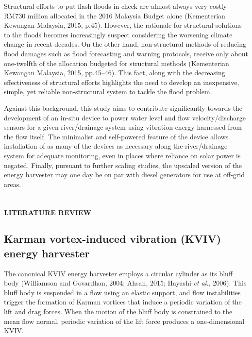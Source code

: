 \documentclass[]{article}
\begin{document}
Structural efforts to put flash floods in check are almost always very
costly - RM730 million allocated in the 2016 Malaysia Budget alone
(Kementerian Kewangan Malaysia, 2015, p.45). However, the rationale for
structural solutions to the floods becomes increasingly suspect
considering the worsening climate change in recent decades. On the other
hand, non-structural methods of reducing flood damages such as flood
forecasting and warning protocols, receive only about one-twelfth of the
allocation budgeted for structural methods (Kementerian Kewangan
Malaysia, 2015, pp.45--46). This fact, along with the decreasing
effectiveness of structural efforts highlights the need to develop an
inexpensive, simple, yet reliable non-structural system to tackle the
flood problem.

Against this background, this study aims to contribute significantly
towards the development of an in-situ device to power water level and
flow velocity/discharge sensors for a given river/drainage system using
vibration energy harnessed from the flow itself. The minimalist and
self-powered feature of the device allows installation of as many of the
devices as necessary along the river/drainage system for adequate
monitoring, even in places where reliance on solar power is negated.
Finally, pursuant to further scaling studies, the upscaled version of
the energy harvester may one day be on par with diesel generators for
use at off-grid areas.

\section{\texorpdfstring{\protect\hypertarget{_Toc461037248}{}{\protect\hypertarget{_Toc461037431}{}{\protect\hypertarget{_Toc41048798}{}{}}}}{}}\label{section-1}

\textbf{LITERATURE REVIEW}

\subsection{\texorpdfstring{\protect\hypertarget{_Toc41048799}{}{\protect\hypertarget{_Hlk21508927}{}{}}Karman
vortex-induced vibration (KVIV) energy
harvester}{Karman vortex-induced vibration (KVIV) energy harvester}}\label{karman-vortex-induced-vibration-kviv-energy-harvester}

\protect\hypertarget{_Hlk525229593}{}{}The canonical KVIV energy
harvester employs a circular cylinder as its bluff body (Williamson and
Govardhan, 2004; Ahsan, 2015; Hayashi \emph{et al.}, 2006). This bluff
body is suspended in a flow using an elastic support, and flow
instabilities trigger the formation of Karman vortices that induce a
periodic variation of the lift and drag forces. When the motion of the
bluff body is constrained to the mean flow normal, periodic variation of
the lift force produces a one-dimensional KVIV.
\end{document}
